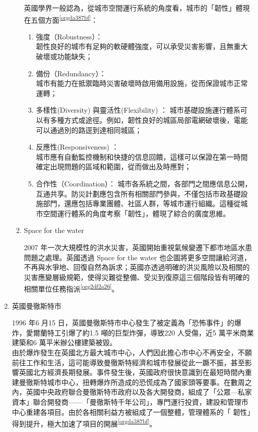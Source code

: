 \documentclass[a4paper,12pt]{article}
\begin{document}
\begin{enumerate}
\begin{enumerate}
英國學界一般認為，從城市空間運行系統的角度看，城市的「韌性」體現在五個方面\textsuperscript{\ref{orgda387bf}}：\\
\begin{enumerate}
\item 強度（Robustness）：\\
韌性良好的城市有足夠的軟硬體強度，可以承受災害影響，且無重大破壞或功能缺失；\\
\item 備份（Redundancy）：\\
城市有能力在抵禦臨時災害破壞時啟用備用設施，從而保證城市正常運轉；\\
\item 多樣性(Diversity) 與靈活性(Flexibility) ： 城市基礎設施運行體系可以有多種方式或途徑。例如，韌性良好的城區局部電網破壞後，電能可以通過別的路逕到達相同城區；\\
\item 反應性(Responsiveness) ：\\
城市應有自動監控機制和快捷的信息回饋，這樣可以保證在第一時間確定出現問題的區域和範圍，從而做出及時應對；\\
\item 合作性（Coordination）：   城市各系統之間，各部門之間應信息公開，互通共享。防災計劃應包含所有相關部門參與，不僅包括市政基礎設施部門，還應包括專業團體、社區人群，等城市運行組織。這種從城市空間運行體系的角度考察「韌性」，體現了綜合的廣度思維。\\
\end{enumerate}

\item Space for the water
\label{sec:org461fa2a}

2007 年一次大規模性的洪水災害，英國開始重視氣候變遷下都市地區水患問題之處理。英國透過 Space for the water 也企圖將更多空間讓給河道，不再與水爭地、回復自然為訴求；英國亦透過明確的洪災風險以及相關的災害應變層級規範，使得災難從整備、受災到復原這三個階段皆有明確的相關單位任務指派\textsuperscript{\ref{org2df2a26}}。\\
\end{enumerate}

\item 英國曼徹斯特市
\label{sec:org6d5bbfe}

1996 年6 月15 日，英國曼徹斯特市中心發生了被定義為「恐怖事件」的爆炸，愛爾蘭特工引爆了約1.5 噸的巨型炸彈，導致220 人受傷，近5 萬平米商業建築和6 萬平米辦公樓建築被毀。\\

由於爆炸發生在英國北方最大城市中心，人們因此擔心市中心不再安全，不願前往工作和生活，這可能導致曼徹斯特經濟和城市發展從此一蹶不振，甚至影響英國北方經濟長期發展。事件發生後，英國政府很快意識到在最短時間內重建曼徹斯特城市中心，扭轉爆炸所造成的恐慌成為了國家頭等要事。在數周之內，英國中央政府聯合曼徹斯特市政府以及各大開發商，組成了「公眾—私家資本」聯合開發商——「曼徹斯特千年公司」，專門運行投資，建設和管理市中心重建各項目。由於各相關利益方被組成了一個整體，管理體系的「 韌性」得到提升，極大加速了項目的開展\textsuperscript{\ref{orgda387bf}}。\\


\end{enumerate}
\end{document}

